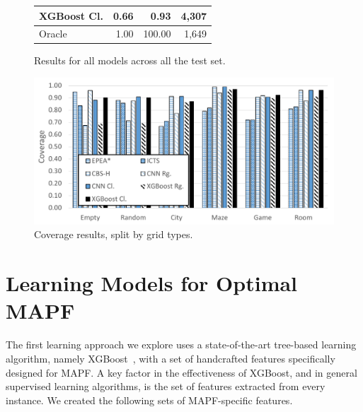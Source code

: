 \documentclass[letterpaper]{article} %
\newcommand\Roni[1]{\nb{\textbf{Roni:}}{red}{#1}}
\begin{document}
\begin{figure}[t]
{\begin{tabular}{@{}lrrr@{}}
 XGBoost Cl. & 0.66 & 0.93 & 4,307 \\
 \midrule
 Oracle & 1.00 & 100.00 & 1,649 \\
\bottomrule
\end{tabular}
}
  \caption{Results for all models across all the test set.}
  \label{table:allResults}  
\endminipage\hfill
{}%
    \includegraphics[width=\columnwidth]{coverageByMap.pdf}
    \caption{Coverage results, split by grid types.}
    \label{fig:coverageByMap}  
\endminipage
\end{figure}

\section{Learning \AS Models for Optimal MAPF}
The first learning approach we explore uses a state-of-the-art tree-based learning algorithm, namely XGBoost~\cite{chen2016xgboost}, with a set of handcrafted features specifically designed for MAPF. 
A key factor in the effectiveness of XGBoost, and in general supervised learning algorithms, is the set of features extracted from every instance. We created the following sets of MAPF-specific features. 
\end{document}
